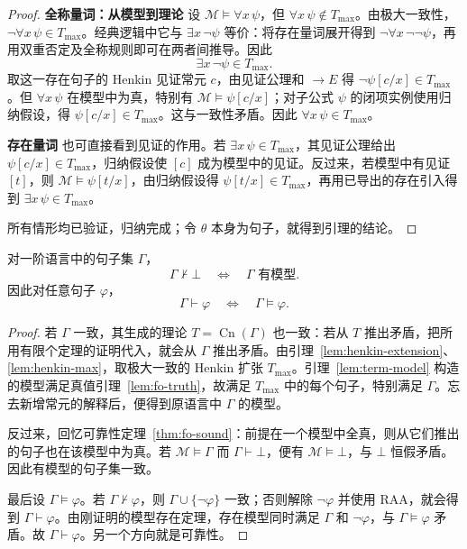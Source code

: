 \documentclass[lang=cn,a4paper,fontset=none,zihao=false,10pt,openany,twoside]{beautybook}
\numberwithin{algorithm}{chapter}
\begin{document}
\begin{proof}
\par\smallskip\noindent\textbf{全称量词：从模型到理论}\quad
设 $\mathcal M\models\forall x\,\psi$，但 $\forall x\,\psi\notin T_{\max}$。由极大一致性，$\neg\forall x\,\psi\in T_{\max}$。经典逻辑中它与 $\exists x\,\neg\psi$ 等价：将存在量词展开得到 $\neg\forall x\,\neg\neg\psi$，再用双重否定及全称规则即可在两者间推导。因此
\[
 \exists x\,\neg\psi\in T_{\max}.
\]
取这一存在句子的 Henkin 见证常元 $c$，由见证公理和 $\to E$ 得 $\neg\psi[c/x]\in T_{\max}$。但 $\forall x\,\psi$ 在模型中为真，特别有 $\mathcal M\models\psi[c/x]$；对子公式 $\psi$ 的闭项实例使用归纳假设，得 $\psi[c/x]\in T_{\max}$。这与一致性矛盾。因此 $\forall x\,\psi\in T_{\max}$。

\par\smallskip\noindent\textbf{存在量词}\quad
也可直接看到见证的作用。若 $\exists x\,\psi\in T_{\max}$，其见证公理给出 $\psi[c/x]\in T_{\max}$，归纳假设使 $[c]$ 成为模型中的见证。反过来，若模型中有见证 $[t]$，则 $\mathcal M\models\psi[t/x]$，由归纳假设得 $\psi[t/x]\in T_{\max}$，再用已导出的存在引入得到 $\exists x\,\psi\in T_{\max}$。

所有情形均已验证，归纳完成；令 $\theta$ 本身为句子，就得到引理的结论。
\end{proof}

\begin{theorem}[模型存在定理与完备性]\label{thm:fo-complete}
对一阶语言中的句子集 $\Gamma$，
\[
 \Gamma\nvdash\bot\quad\Longleftrightarrow\quad\Gamma\text{ 有模型}.
\]
因此对任意句子 $\varphi$，
\[
 \Gamma\vdash\varphi\quad\Longleftrightarrow\quad\Gamma\models\varphi.
\]
\end{theorem}
\begin{proof}
若 $\Gamma$ 一致，其生成的理论 $T=\operatorname{Cn}(\Gamma)$ 也一致：若从 $T$ 推出矛盾，把所用有限个定理的证明代入，就会从 $\Gamma$ 推出矛盾。由引理~\ref{lem:henkin-extension}、\ref{lem:henkin-max}，取极大一致的 Henkin 扩张 $T_{\max}$。引理~\ref{lem:term-model} 构造的模型满足真值引理~\ref{lem:fo-truth}，故满足 $T_{\max}$ 中的每个句子，特别满足 $\Gamma$。忘去新增常元的解释后，便得到原语言中 $\Gamma$ 的模型。

反过来，回忆可靠性定理~\ref{thm:fo-sound}：前提在一个模型中全真，则从它们推出的句子也在该模型中为真。若 $\mathcal M\models\Gamma$ 而 $\Gamma\vdash\bot$，便有 $\mathcal M\models\bot$，与 $\bot$ 恒假矛盾。因此有模型的句子集一致。

最后设 $\Gamma\models\varphi$。若 $\Gamma\nvdash\varphi$，则 $\Gamma\cup\{\neg\varphi\}$ 一致；否则解除 $\neg\varphi$ 并使用 RAA，就会得到 $\Gamma\vdash\varphi$。由刚证明的模型存在定理，存在模型同时满足 $\Gamma$ 和 $\neg\varphi$，与 $\Gamma\models\varphi$ 矛盾。故 $\Gamma\vdash\varphi$。另一个方向就是可靠性。
\end{proof}
\end{document}
